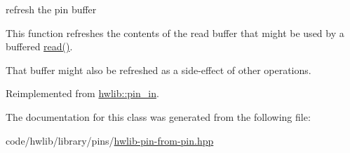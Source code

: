 refresh the pin buffer

This function refreshes the contents of the read buffer that might be used by a buffered \hyperlink{classhwlib_1_1pin__in__from__in__t_a981fa53647035e85ac71ec426c41b69f}{read()}.

That buffer might also be refreshed as a side-\/effect of other operations. 

Reimplemented from \hyperlink{classhwlib_1_1pin__in_a3fb1bfb1ec962bb6d31a5e865f0d0acb}{hwlib\+::pin\+\_\+in}.



The documentation for this class was generated from the following file\+:\begin{DoxyCompactItemize}
\item 
code/hwlib/library/pins/\hyperlink{hwlib-pin-from-pin_8hpp}{hwlib-\/pin-\/from-\/pin.\+hpp}\end{DoxyCompactItemize}
